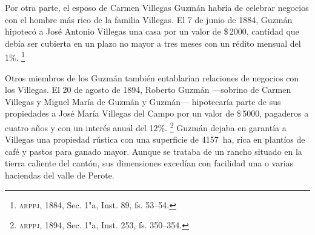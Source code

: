 \documentclass[14pt,twoside,final]{extbook} %
\let\oldfootnote\footnote
\renewcommand\footnote[1]{%
\oldfootnote{\hspace{1mm}#1}}
\begin{document}
Por otra parte, el esposo de Carmen Villegas Guzmán habría de celebrar negocios con el hombre más rico de la familia Villegas. El 7 de junio de 1884, Guzmán hipotecó a José Antonio Villegas una casa por un valor de \$\,2000, cantidad que debía ser cubierta en un plazo no mayor a tres meses con un rédito mensual del 1\%.\footnote{\textsc{arppj}, 1884, Sec. 1"a, Inst. 89, fs. 53--54.}

Otros miembros de los Guzmán también entablarían relaciones de negocios con los Villegas. El 20 de agosto de 1894, Roberto Guzmán ---sobrino de Carmen Villegas y Miguel María de Guzmán y Guzmán--- hipotecaría parte de sus propiedades a José María Villegas del Campo por un valor de \$\,5000, pagaderos a cuatro años y con un interés anual del 12\%.\footnote{\textsc{arppj}, 1894, Sec. 1"a, Inst. 253, fs. 350--354.} Guzmán dejaba en garantía a Villegas una propiedad rústica con una superficie de 4157~ha, rica en plantíos de café y pastos para ganado mayor. Aunque se trataba de un rancho situado en la tierra caliente del cantón, sus dimensiones excedían con facilidad una o varias haciendas del valle de Perote.
\end{document}
